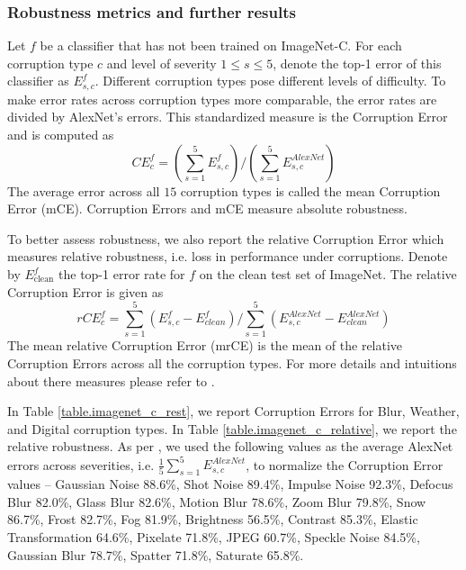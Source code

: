 \documentclass{article}
\begin{document}
\subsubsection{Robustness metrics and further results} \label{sec:robust_app.results}
Let $f$ be a classifier that has not been trained on ImageNet-C.
For each corruption type $c$ and level of severity $1\leq s \leq 5$, denote the top-1 error of this classifier as $E^{f}_{s,c}$.
Different corruption types pose different levels of difficulty. 
To make error rates across corruption types more comparable, the error rates are divided by AlexNet's errors. 
This standardized measure is the Corruption Error and is computed as 
\begin{equation*}
    CE^{f}_{c} = \left(\sum_{s=1}^{5}  E_{s,c}^{f} \right) /\left(\sum_{s=1}^{5} E_{s,c}^{AlexNet}\right)
\end{equation*}
The average error across all $15$ corruption types is called the mean Corruption Error (mCE).
Corruption Errors and mCE measure absolute robustness.

To better assess robustness, we also report the relative Corruption Error which measures relative robustness, i.e. loss in performance under corruptions. 
Denote by $E^{f}_{\text{clean}}$ the top-1 error rate for $f$ on the clean test set of ImageNet. 
The relative Corruption Error is given as
\begin{equation*}
     rCE^{f}_{c} = \sum_{s=1}^{5} \left(E_{s,c}^{f} - E^{f}_{clean}\right) / \sum_{s=1}^{5} \left(E_{s,c}^{AlexNet} - E_{clean}^{AlexNet}\right)
\end{equation*}
The mean relative Corruption Error (mrCE) is the mean of the relative Corruption Errors across all the corruption types.
For more details and intuitions about there measures please refer to \citep{hendrycks2019robustness}.

In Table \ref{table.imagenet_c_rest}, we report Corruption Errors for Blur, Weather, and Digital corruption types.
In Table \ref{table.imagenet_c_relative}, we report the relative robustness. 
As per \citep{hendrycks2019robustness}, we used the following values as the average AlexNet errors across severities, i.e. $\frac{1}{5} \sum_{s=1}^{5} E_{s, c}^{AlexNet}$, to normalize the Corruption Error values -- 
Gaussian Noise 88.6\%, Shot Noise 89.4\%, Impulse Noise 92.3\%, Defocus Blur
82.0\%, Glass Blur 82.6\%, Motion Blur 78.6\%, Zoom Blur 79.8\%, Snow 86.7\%, Frost
82.7\%, Fog 81.9\%, Brightness 56.5\%, Contrast 85.3\%, Elastic Transformation 64.6\%,
Pixelate 71.8\%, JPEG 60.7\%, Speckle Noise 84.5\%, Gaussian Blur 78.7\%, Spatter 71.8\%,
Saturate 65.8\%.
\end{document}
